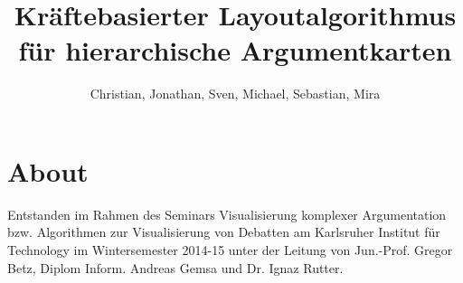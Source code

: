 \documentclass{algo-paper}
\title{Kräftebasierter Layoutalgorithmus für hierarchische Argumentkarten}
\subtitle{\vskip 2.5em Seminararbeit zur Veranstalltung Visualisierung komplexer Argumentation \vskip 1.5em}
\author{Christian, Jonathan, Sven, Michael, Sebastian, Mira}
\theoremstyle{changebreak}
\begin{document}
  


\cleardoublepage



\listoftodos
\cleardoublepage


\tableofcontents
\cleardoublepage












\chapter*{About}
Entstanden im Rahmen des Seminars Visualisierung komplexer Argumentation bzw. Algorithmen zur Visualisierung von Debatten 
am Karlsruher Institut für Technology im Wintersemester 2014-15 unter der Leitung von 
Jun.-Prof. Gregor Betz, Diplom Inform. Andreas Gemsa und Dr. Ignaz Rutter.
\end{document}
